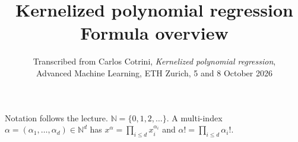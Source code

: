 \documentclass[11pt,a4paper]{article}
\title{Kernelized polynomial regression\\[0.3em]
\large Formula overview}
\author{Transcribed from Carlos Cotrini,
\emph{Kernelized polynomial regression},\\
Advanced Machine Learning, ETH Zurich, 5 and 8 October 2026}
\date{}
\newcommand{\N}{\mathbb{N}}
\begin{document}
\maketitle
\thispagestyle{empty}

\noindent
Notation follows the lecture. \(\N=\{0,1,2,\ldots\}\).
A multi-index \(\alpha=(\alpha_1,\ldots,\alpha_d)\in\N^d\) has
\(x^\alpha=\prod_{i\le d}x_i^{\alpha_i}\) and \(\alpha!=\prod_{i\le d}\alpha_i!\).

\tableofcontents
\vspace{1em}








{\small


}
\end{document}
